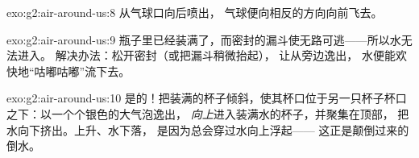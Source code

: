 \begin{solution}{exo:g2:air-around-us:8}
从气球口向后喷出，
气球便向相反的方向向前飞去。
\end{solution}

\begin{solution}{exo:g2:air-around-us:9}
瓶子里已经装满了，而密封的漏斗使无路可逃——所以水无法进入。
解决办法：松开密封（或把漏斗稍微抬起），
让从旁边逸出，
水便能欢快地“咕嘟咕嘟”流下去。
\end{solution}

\begin{solution}{exo:g2:air-around-us:10}
是的！把装满的杯子倾斜，使其杯口位于另一只杯子杯口之下：以一个个银色的大气泡逸出，
\emph{向上}进入装满水的杯子，并聚集在顶部，
把水向下挤出。上升、水下落，
是因为总会穿过水向上浮起——
这正是颠倒过来的倒水。
\end{solution}
